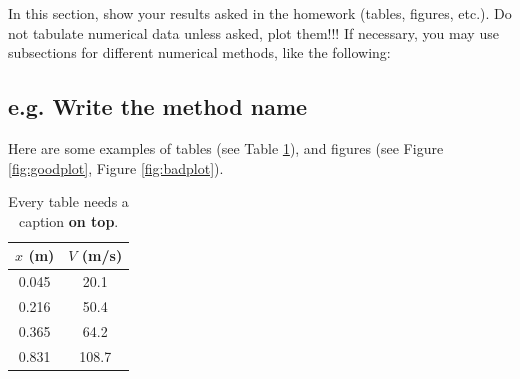 \documentclass[letterpaper,12pt]{article}
\begin{document}
In this section, show your results asked in the homework (tables, figures, etc.).
Do not tabulate numerical data unless asked, plot them!!! If necessary,
you may use subsections for different numerical methods, like the following:

\subsection{e.g. Write the method name}

Here are some examples of tables (see Table \ref{tbl:velocity}), and figures 
(see Figure \ref{fig:goodplot}, Figure \ref{fig:badplot}).
 
\begin{table}[ht]
\begin{center}
\caption{Every table needs a caption \textbf{on top}.}
\label{tbl:velocity}
\begin{tabular}{|c|c|} 
\hline
\multicolumn{1}{|c|}{\bf{$x$ (m)}} & \multicolumn{1}{c|}{\bf{$V$ (m/s)}} \\
\hline
0.045 &   20.1 \\ \hline
0.216 &   50.4 \\ \hline
0.365 &   64.2 \\ \hline
0.831 &  108.7 \\ \hline
\end{tabular}
\end{center}
\end{table}
\end{document}
